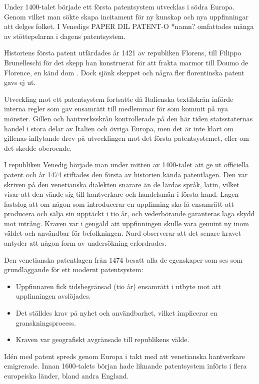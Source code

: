 Under 1400-talet började ett första patentsystem utvecklas i södra Europa.
Genom vilket man sökte skapa incitament för ny kunskap och nya uppfinningar att delges folket. 
I Venedigs PAPER DIL PATENT-O *namn? omfattades många av stöttepelarna i dagens patentsystem.

Historiens första patent utfärdades år 1421 av republiken Florens, till Filippo Brunelleschi för det skepp han konstruerat för att frakta marmor till Doumo de Florence, en känd dom \cite{frumkin}. 
Dock sjönk skeppet och några fler florentinska patent gavs ej ut.

Utveckling mot ett patentsystem fortsatte då Italienska textilskrån införde interna regler som gav ensamrätt till medlemmar för som kommit på nya mönster.
Gillen och hantverksskrån kontrollerade på den här tiden statsstaternas handel i stora delar av Italien och övriga Europa, men det är inte klart om gillenas inflytande drev på utvecklingen mot det första patentsystemet, eller om det skedde oberoende.

I republiken Venedig började man under mitten av 1400-talet att ge ut officiella patent och år 1474 stiftades den första av historien kända patentlagen\cite{frumkin}.
Den var skriven på den venetianska dialekten snarare än de lärdas språk, latin, vilket visar att den vände sig till hantverkare och handelsmän i första hand.
Lagen fastslog att om någon som introducerar en uppfinning ska få ensamrätt att producera och sälja sin upptäckt i tio år, och vederbörande garanteras laga skydd mot intrång. 
Kraven var i gengäld att uppfinningen skulle vara genuint ny inom väldet och användbar för befolkningen. 
Nard observerar att det senare kravet antyder att någon form av undersökning erfordrades\cite{nard}. 

Den venetianska patentlagen från 1474 besatt alla de egenskaper som ses som grundläggande för ett modernt patentsystem:

\begin{itemize}
    \item Uppfinnaren fick tidsbegränsad (tio år) ensamrätt i utbyte mot att uppfinningen avslöjades.
    \item Det ställdes krav på nyhet och användbarhet, vilket implicerar en granskningsprocess.
    \item Kraven var geografiskt avgränsade till republikens välde.
\end{itemize}

Idén med patent spreds genom Europa i takt med att venetianska hantverkare emigrerade. 
Innan 1600-talets början hade liknande patentsystem införts i flera europeiska länder, bland andra England.

